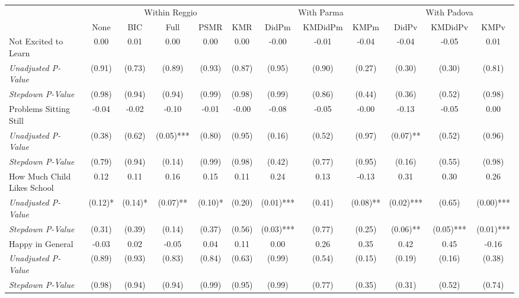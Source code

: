 \begin{tabular}{l c c c c c c c c c c c}
\toprule
& \multicolumn{5}{c}{Within Reggio} & \multicolumn{3}{c}{With Parma} & \multicolumn{3}{c}{With Padova} \\\cmidrule(lr){2-6} \cmidrule(lr){7-9} \cmidrule(lr){10-12}
 & None & BIC & Full & PSMR & KMR & DidPm & KMDidPm & KMPm & DidPv & KMDidPv & KMPv \\
\midrule
Not Excited to Learn & 0.00 & 0.01 & 0.00 & 0.00 & 0.00 & -0.00 & -0.01 & -0.04 & -0.04 & -0.05 & 0.01 \\
\quad \textit{Unadjusted P-Value} & (0.91) & (0.73) & (0.89) & (0.93) & (0.87) & (0.95) & (0.90) & (0.27) & (0.30) & (0.30) & (0.81) \\
\quad \textit{Stepdown P-Value} & (0.98) & (0.94) & (0.94) & (0.99) & (0.98) & (0.99) & (0.86) & (0.44) & (0.36) & (0.52) & (0.98) \\
Problems Sitting Still & -0.04 & -0.02 & -0.10 & -0.01 & -0.00 & -0.08 & -0.05 & -0.00 & -0.13 & -0.05 & 0.00 \\
\quad \textit{Unadjusted P-Value} & (0.38) & (0.62) & (0.05)*** & (0.80) & (0.95) & (0.16) & (0.52) & (0.97) & (0.07)** & (0.52) & (0.96) \\
\quad \textit{Stepdown P-Value} & (0.79) & (0.94) & (0.14) & (0.99) & (0.98) & (0.42) & (0.77) & (0.95) & (0.16) & (0.55) & (0.98) \\
How Much Child Likes School & 0.12 & 0.11 & 0.16 & 0.15 & 0.11 & 0.24 & 0.13 & -0.13 & 0.31 & 0.30 & 0.26 \\
\quad \textit{Unadjusted P-Value} & (0.12)* & (0.14)* & (0.07)** & (0.10)* & (0.20) & (0.01)*** & (0.41) & (0.08)** & (0.02)*** & (0.65) & (0.00)*** \\
\quad \textit{Stepdown P-Value} & (0.31) & (0.39) & (0.14) & (0.37) & (0.56) & (0.03)*** & (0.77) & (0.25) & (0.06)** & (0.05)*** & (0.01)*** \\
Happy in General & -0.03 & 0.02 & -0.05 & 0.04 & 0.11 & 0.00 & 0.26 & 0.35 & 0.42 & 0.45 & -0.16 \\
\quad \textit{Unadjusted P-Value} & (0.89) & (0.93) & (0.83) & (0.84) & (0.63) & (0.99) & (0.54) & (0.15) & (0.19) & (0.16) & (0.38) \\
\quad \textit{Stepdown P-Value} & (0.98) & (0.94) & (0.94) & (0.99) & (0.95) & (0.99) & (0.77) & (0.35) & (0.31) & (0.52) & (0.74) \\
\bottomrule
\end{tabular}
